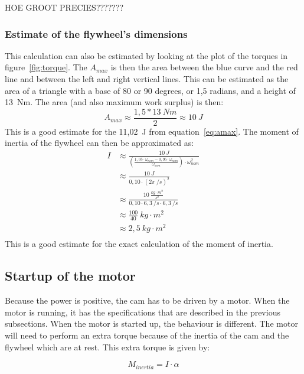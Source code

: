 \documentclass[a4paper]{article}
\begin{document}
HOE GROOT PRECIES???????

\subsubsection{Estimate of the flywheel's dimensions}

This calculation can also be estimated by looking at the plot of the torques in figure~\ref{fig:torque}. The \(A_{max}\) is then the area between the blue curve and the red line and between the left and right vertical lines. This can be estimated as the area of a triangle with a base of 80 or 90 degrees, or 1,5 radians, and a height of 13~Nm. The area (and also maximum work surplus) is then:
\begin{equation}
	A_{max}\approx\frac{1,5*13~Nm}{2}\approx 10~J
\end{equation} 
This is a good estimate for the 11,02~J from equation~\ref{eq:amax}. The moment of inertia of the flywheel can then be approximated as:
\begin{equation}
	\begin{split}
	I &\approx\frac{10~J}{(\frac{1,05\cdot \omega_{nom}-0,95\cdot\omega_{nom}}{\omega_{nom}})\cdot\omega_{nom}^2}\\
	 &\approx \frac{10~J}{0,10\cdot(2\pi~/s)^2}\\
	 &\approx \frac{10~\frac{kg\cdot m^2}{s^2}}{0,10\cdot 6,3~/s \cdot 6,3~/s}\\
	 &\approx \frac{100}{40}~kg\cdot m^2\\
	 &\approx 2,5~kg\cdot m^2\\
	\end{split}
\end{equation}
This is a good estimate for the exact calculation of the moment of inertia.

\subsection{Startup of the motor}

Because the power is positive, the cam has to be driven by a motor. When the motor is running, it has the specifications that are described in the previous subsections. When the motor is started up, the behaviour is different. The motor will need to perform an extra torque because of the inertia of the cam and the flywheel which are at rest. This extra torque is given by:

\begin{equation}
	M_{inertia} = I \cdot \alpha
\end{equation}
\end{document}
